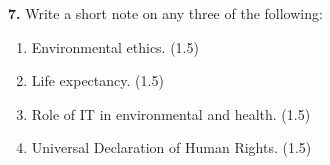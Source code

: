 \documentclass[12pt,a4paper]{article}
\begin{document}
\noindent \textbf{7.} \quad Write a short note on any three of the following:

\begin{enumerate}[label=(\alph*)]
    \item Environmental ethics. (1.5)
    \item Life expectancy. (1.5)
    \item Role of IT in environmental and health. (1.5)
    \item Universal Declaration of Human Rights. (1.5)
\end{enumerate}
\end{document}

